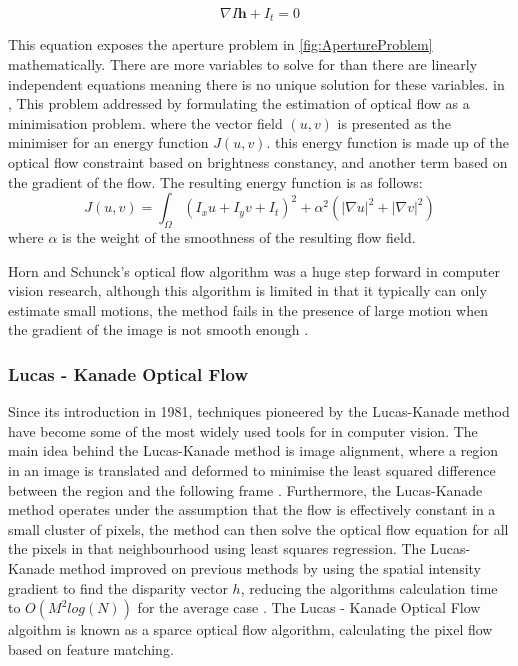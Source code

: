 \documentclass{UoNMCHA}
\numberwithin{equation}{section}
\begin{document}
\begin{equation}
	\nabla I \mathbf{h} + I_{t} = 0
\end{equation}

This equation exposes the aperture problem in \ref{fig:ApertureProblem} mathematically. There are more variables to solve for than there are linearly independent equations meaning there is no unique solution for these variables. in \cite{horn1981determining}, This problem addressed by formulating the estimation of optical flow as a minimisation problem. where the vector field $(u, v)$ is presented as the minimiser for an energy function $J(u, v)$. this energy function is made up of the optical flow constraint based on brightness constancy, and another term based on the gradient of the flow. The resulting energy function is as follows:
\begin{equation}
	J(u, v) = \int_{\Omega}(I_{x}u + I_{y}v + I_{t})^{2} + \alpha^2(|\nabla u|^{2} + |\nabla v|^{2})
\end{equation}
where $\alpha$ is the weight of the smoothness of the resulting flow field.

Horn and Schunck's optical flow algorithm was a huge step forward in computer vision research, although this algorithm is limited in that it typically can only estimate small motions, the method fails in the presence of large motion when the gradient of the image is not smooth enough \citep{meinhardt2013horn}.

\subsubsection{Lucas - Kanade Optical Flow}
Since its introduction in 1981, techniques pioneered by the Lucas-Kanade method have become some of the most widely used tools for in computer vision. The main idea behind the Lucas-Kanade method is image alignment, where a region in an image is translated and deformed to minimise the least squared difference between the region and the following frame \citep{lucasKanade20yearson}. Furthermore, the Lucas-Kanade method operates under the assumption that the flow is effectively constant in a small cluster of pixels, the method can then solve the optical flow equation for all the pixels in that neighbourhood using least squares regression. The Lucas-Kanade method improved on previous methods by using the spatial intensity gradient to find the disparity vector $h$, reducing the algorithms calculation time to $O(M^2log(N))$ for the average case \citep{rojas2010lucas}. The Lucas - Kanade Optical Flow algoithm is known as a sparce optical flow algorithm, calculating the pixel flow based on feature matching.
\end{document}

